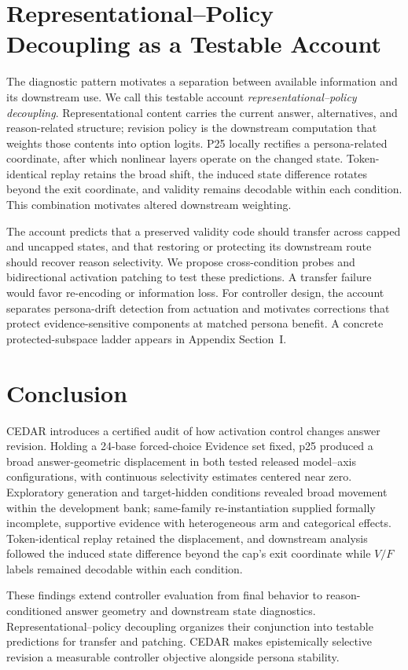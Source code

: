 \documentclass[letterpaper]{article} %
\begin{document}
\section{Representational--Policy Decoupling as a Testable Account}
\label{sec:implications}

The diagnostic pattern motivates a separation between available information and its downstream use. We call this testable account \emph{representational--policy decoupling}. Representational content carries the current answer, alternatives, and reason-related structure; revision policy is the downstream computation that weights those contents into option logits. P25 locally rectifies a persona-related coordinate, after which nonlinear layers operate on the changed state. Token-identical replay retains the broad shift, the induced state difference rotates beyond the exit coordinate, and validity remains decodable within each condition. This combination motivates altered downstream weighting.

The account predicts that a preserved validity code should transfer across capped and uncapped states, and that restoring or protecting its downstream route should recover reason selectivity. We propose cross-condition probes and bidirectional activation patching to test these predictions. A transfer failure would favor re-encoding or information loss. For controller design, the account separates persona-drift detection from actuation and motivates corrections that protect evidence-sensitive components at matched persona benefit. A concrete protected-subspace ladder appears in Appendix Section~I.

\section{Conclusion}
\label{sec:conclusion}

CEDAR introduces a certified audit of how activation control changes answer revision. Holding a 24-base forced-choice Evidence set fixed, p25 produced a broad answer-geometric displacement in both tested released model--axis configurations, with continuous selectivity estimates centered near zero. Exploratory generation and target-hidden conditions revealed broad movement within the development bank; same-family re-instantiation supplied formally incomplete, supportive evidence with heterogeneous arm and categorical effects. Token-identical replay retained the displacement, and downstream analysis followed the induced state difference beyond the cap's exit coordinate while $V/F$ labels remained decodable within each condition.

These findings extend controller evaluation from final behavior to reason-conditioned answer geometry and downstream state diagnostics. Representational--policy decoupling organizes their conjunction into testable predictions for transfer and patching. CEDAR makes epistemically selective revision a measurable controller objective alongside persona stability.


\end{document}
